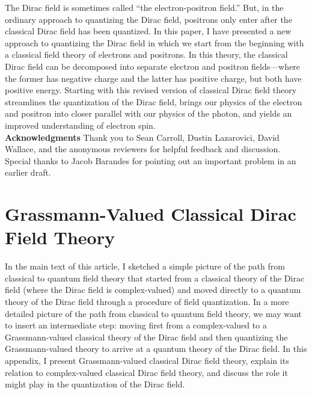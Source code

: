 \documentclass[12pt,secnumarabic,amsmath,amssymb,balancelastpage,nofootinbib]{article}
\begin{document}
The Dirac field is sometimes called ``the electron-positron field.''  But, in the ordinary approach to quantizing the Dirac field, positrons only enter after the classical Dirac field has been quantized.  In this paper, I have presented a new approach to quantizing the Dirac field in which we start from the beginning with a classical field theory of electrons and positrons.  In this theory, the classical Dirac field can be decomposed into separate electron and positron fields---where the former has negative charge and the latter has positive charge, but both have positive energy.  Starting with this revised version of classical Dirac field theory streamlines the quantization of the Dirac field, brings our physics of the electron and positron into closer parallel with our physics of the photon, and yields an improved understanding of electron spin.\\



\vspace*{12 pt}
\noindent
\textbf{Acknowledgments}
Thank you to Sean Carroll, Dustin Lazarovici, David Wallace, and the anonymous reviewers for helpful feedback and discussion.  Special thanks to Jacob Barandes for pointing out an important problem in an earlier draft.\\

\appendix
\section{Grassmann-Valued Classical Dirac Field Theory}\label{GrassmannCDFT}

In the main text of this article, I sketched a simple picture of the path from classical to quantum field theory that started from a classical theory of the Dirac field (where the Dirac field is complex-valued) and moved directly to a quantum theory of the Dirac field through a procedure of field quantization.  In a more detailed picture of the path from classical to quantum field theory, we may want to insert an intermediate step: moving first from a complex-valued to a Grassmann-valued classical theory of the Dirac field and then quantizing the Grassmann-valued theory to arrive at a quantum theory of the Dirac field.  In this appendix, I present Grassmann-valued classical Dirac field theory, explain its relation to complex-valued classical Dirac field theory, and discuss the role it might play in the quantization of the Dirac field.
\end{document}
